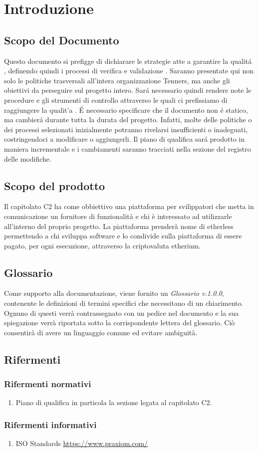 \section{Introduzione}

\subsection{Scopo del Documento}
Questo documento si prefigge di dichiarare le strategie atte a garantire la qualit\'a \glo, definendo quindi i processi di verifica \glo e validazione \glo. Saranno presentate qui non solo le politiche trasversali all'intera organizzazione Tenners, ma anche gli obiettivi da perseguire sul progetto intero. Sar\'a necessario quindi rendere note le procedure e gli strumenti di controllo attraverso le quali ci prefissiamo di raggiungere la qualit'a \glo.
\'E necessario specificare che il documento non \'e statico, ma cambier\'a durante tutta la durata del progetto. Infatti, molte delle politiche o dei processi selezionati inizialmente potranno rivelarsi insufficienti o inadeguati, costringendoci a modificare o aggiungerli. Il piano di qualifica \glo sar\'a prodotto in maniera incrementale e i cambiamenti saranno tracciati nella sezione del registro delle modifiche.

\subsection{Scopo del prodotto}
Il capitolato C2 ha come obbiettivo una piattaforma per svilippatori che metta
in comunicazione un fornitore di funzionalit\`a e chi \`e interessato ad utilizzarle
all'interno del proprio progetto.
La piattaforma prender\`a nome di etherless permettendo a chi sviluppa software e
lo condivide sulla piattaforma di essere pagato, per ogni esecuzione, attraverso
la criptovaluta etherium.


\subsection{Glossario}
Come supporto alla documentazione, viene fornito un \textit{Glossario v.1.0.0},
contenente le definizioni di termini specifici che necessitano di un chiarimento.
Ognuno di questi verr\`a contrassegnato con un pedice \glo nel documento e la sua
spiegazione verr\`a riportata sotto la corrispondente lettera del glossario. Ci\`o
consentir\`a di avere un linguaggio comune ed evitare ambiguit\`a.

\subsection{Rifermenti}
\subsubsection{Rifermenti normativi}
\begin{enumerate}
  \item Piano di qualifica in particola la sezione legata al capitolato C2.
\end{enumerate}
\subsubsection{Rifermenti informativi}
\begin{enumerate}
  \item ISO Standards
	\url{https://www.praxiom.com/}
\end{enumerate}
